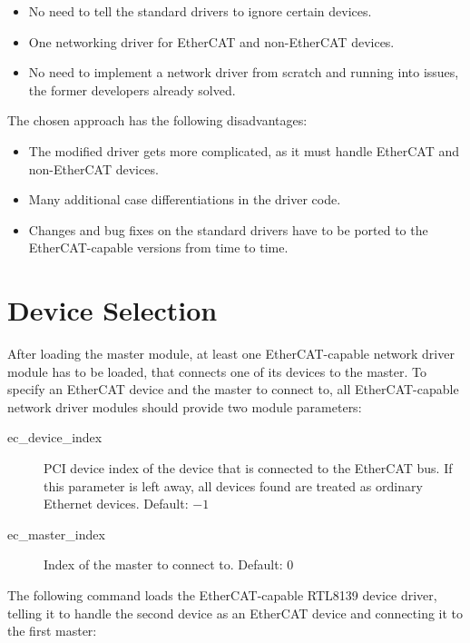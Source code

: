 \documentclass[a4paper,12pt,BCOR6mm,bibtotoc,idxtotoc]{scrbook}
\begin{document}
\begin{itemize}
\item No need to tell the standard drivers to ignore certain devices.
\item One networking driver for EtherCAT and non-EtherCAT devices.
\item No need to implement a network driver from scratch and running
  into issues, the former developers already solved.
\end{itemize}

The chosen approach has the following disadvantages:

\begin{itemize}
\item The modified driver gets more complicated, as it must handle
  EtherCAT and non-EtherCAT devices.
\item Many additional case differentiations in the driver code.
\item Changes and bug fixes on the standard drivers have to be ported
  to the Ether\-CAT-capable versions from time to time.
\end{itemize}


\section{Device Selection}
\label{sec:deviceselection}

After loading the master module, at least one EtherCAT-capable network
driver module has to be loaded, that connects one of its devices to
the master. To specify an EtherCAT device and the master to connect
to, all EtherCAT-capable network driver modules should provide two
module parameters:

\begin{description}
\item[ec\_device\_index] PCI device index of the device that is
  connected to the EtherCAT bus. If this parameter is left away, all
  devices found are treated as ordinary Ethernet devices. Default:
  $-1$
\item[ec\_master\_index] Index of the master to connect to. Default:
  $0$
\end{description}

The following command loads the EtherCAT-capable RTL8139 device
driver, telling it to handle the second device as an EtherCAT device
and connecting it to the first master:
\end{document}
